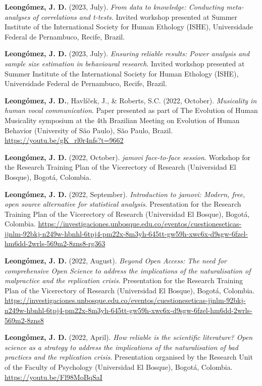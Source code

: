 \documentclass[11pt,a4paper,]{awesome-cv}
\begin{document}
\begingroup
\footnotesize
\setlength{\parindent}{-0.5in}
\setlength{\leftskip}{0.5in}

\textbf{Leongómez, J. D.} (2023, July). \emph{From data to knowledge:
Conducting meta-analyses of correlations and t-tests}. Invited workshop
presented at Summer Institute of the International Society for Human
Ethology (ISHE), Universidade Federal de Pernambuco, Recife, Brazil.

\textbf{Leongómez, J. D.} (2023, July). \emph{Ensuring reliable results:
Power analysis and sample size estimation in behavioural research}.
Invited workshop presented at Summer Institute of the International
Society for Human Ethology (ISHE), Universidade Federal de Pernambuco,
Recife, Brazil.

\textbf{Leongómez, J. D.}, Havlíček, J., \& Roberts, S.C. (2022,
October). \emph{Musicality in human vocal communication}. Paper
presented as part of The Evolution of Human Musicality symposium at the
4th Brazilian Meeting on Evolution of Human Behavior (University of São
Paulo), São Paulo, Brazil. \url{https://youtu.be/gK_rl0r4nfs?t=9662}

\textbf{Leongómez, J. D.} (2022, October). \emph{jamovi face-to-face
session}. Workshop for the Research Training Plan of the Vicerectory of
Research (Universidad El Bosque), Bogotá, Colombia.

\textbf{Leongómez, J. D.} (2022, September). \emph{Introduction to
jamovi: Modern, free, open source alternative for statistical analysis}.
Presentation for the Research Training Plan of the Vicerectory of
Research (Universidad El Bosque), Bogotá, Colombia.
\url{https://investigaciones.unbosque.edu.co/eventos/cuestioneseticas-jjnlm-92bkj-n249w-hbnhl-6tpj4-pm22x-8m3yh-645tt-gw59h-xwc6x-d9sgw-6fzel-hm6dd-2wrls-569m2-8zns8-rg363}

\textbf{Leongómez, J. D.} (2022, August). \emph{Beyond Open Access: The
need for comprehensive Open Science to address the implications of the
naturalisation of malpractice and the replication crisis}. Presentation
for the Research Training Plan of the Vicerectory of Research
(Universidad El Bosque), Bogotá, Colombia.
\url{https://investigaciones.unbosque.edu.co/eventos/cuestioneseticas-jjnlm-92bkj-n249w-hbnhl-6tpj4-pm22x-8m3yh-645tt-gw59h-xwc6x-d9sgw-6fzel-hm6dd-2wrls-569m2-8zns8}

\textbf{Leongómez, J. D.} (2022, April). \emph{How reliable is the
scientific literature? Open science as a strategy to address the
implications of the naturalisation of bad practices and the replication
crisis}. Presentation organised by the Research Unit of the Faculty of
Psychology (Universidad El Bosque), Bogotá, Colombia.
\url{https://youtu.be/Fl98MoBqSaI}
\end{document}
